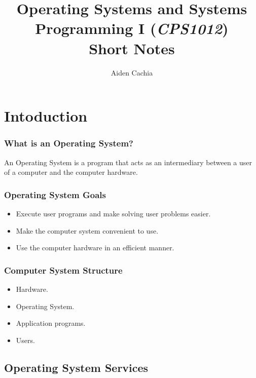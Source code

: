 \documentclass[]{article}
\begin{document}
\title{Operating Systems and Systems Programming I (\emph{CPS1012})\\ Short Notes}
\author{Aiden Cachia}
\date{}

\maketitle
\tableofcontents
\pagebreak

\section{Intoduction}

\subsubsection*{What is an Operating System?}

An Operating System is a program that acts as an intermediary between a user of a computer and the computer hardware.

\subsubsection*{Operating System Goals}

\begin{itemize}
    \item Execute user programs and make solving user problems easier.
    \item Make the computer system convenient to use.
    \item Use the computer hardware in an efficient manner.
\end{itemize}

\subsubsection*{Computer System Structure}
\begin{itemize}
    \item Hardware.
    \item Operating System.
    \item Application programs.
    \item Users.
\end{itemize}

\subsection{Operating System Services}
\end{document}

